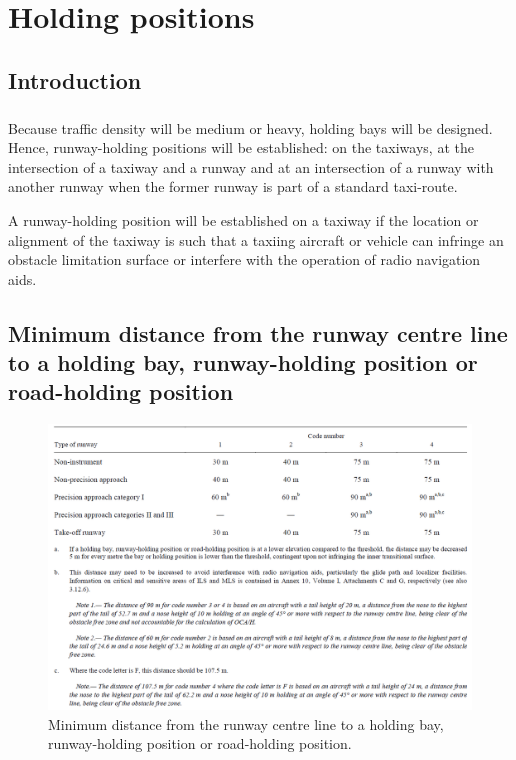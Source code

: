 \chapter{Holding positions}

	\section{Introduction}
	\paragraph{} Because traffic density will be medium or heavy, holding bays will be designed. Hence, runway-holding positions will be established:
	on the taxiways, at the intersection of a taxiway and a runway and at an intersection of a runway with another runway when the former runway is part of a standard taxi-route.
	
	A runway-holding position will be established on a taxiway if the location or alignment of the taxiway is such that a taxiing aircraft or vehicle can infringe an obstacle limitation surface or interfere with the operation of radio navigation aids.
	
	\section{Minimum distance from the runway centre line to a holding bay, runway-holding position or road-holding position}
	
	\begin{figure}[H]
		\centering
		\includegraphics[clip, trim=0cm 0cm 0cm 0cm, width=1.1\textwidth]{./images/holding/distances}
		\caption{Minimum distance from the runway centre line to a holding bay, runway-holding position or road-holding position.}
		\label{distances}
	\end{figure}

